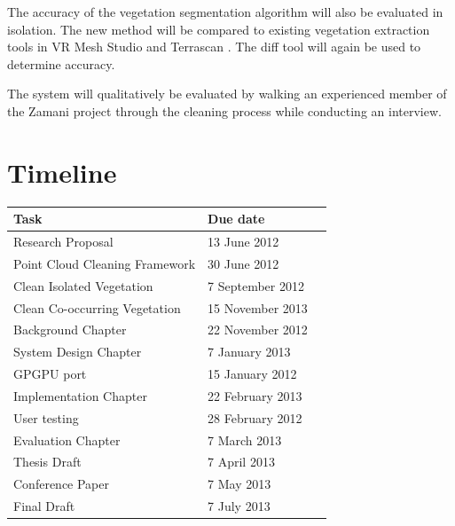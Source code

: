 \documentclass[10pt,twocolumn]{article}
\begin{document}
The accuracy of the vegetation segmentation algorithm will also be evaluated in isolation. The new method will be compared to existing vegetation extraction tools in VR Mesh Studio \cite{VirtualGrid2012} and Terrascan \cite{Terrasolid2012}. The diff tool will again be used to determine accuracy.


The system will qualitatively be evaluated by walking an experienced member of the Zamani project through the cleaning process while conducting an interview.
			

\section{Timeline}
\begin{table}[h]
\begin{tabular}{llr}
\hline
Task & Due date \\
\hline
Research Proposal & 13 June 2012\\
Point Cloud Cleaning Framework & 30 June 2012\\
Clean Isolated Vegetation & 7 September 2012\\
Clean Co-occurring Vegetation & 15 November 2013\\
Background Chapter & 22 November 2012\\
System Design Chapter & 7 January 2013\\
GPGPU port & 15 January 2012\\
Implementation Chapter & 22 February 2013\\
User testing & 28 February 2012\\ %
Evaluation Chapter & 7 March 2013\\
Thesis Draft & 7 April 2013\\
Conference Paper & 7 May 2013\\
Final Draft & 7 July 2013\\
\hline
\end{tabular}
\end{table}
\end{document}

